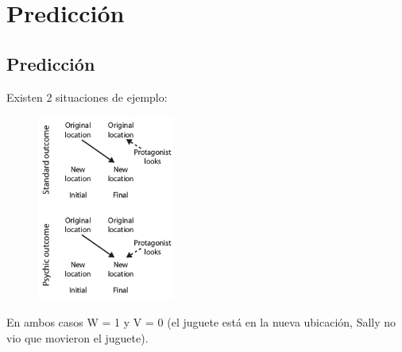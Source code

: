 \documentclass{beamer}
\begin{document}
\section{Predicción}

\subsection{Predicción}
\begin{frame}

Existen 2 situaciones de ejemplo:

\begin{figure}[h!]
  \centering
    \includegraphics[width=0.4\textwidth]{imagenes/situaciones.jpg}
\end{figure}

En ambos casos W = 1 y V = 0 (el juguete está en la nueva ubicación, Sally no vio que movieron el juguete).

\end{frame}
\end{document}
